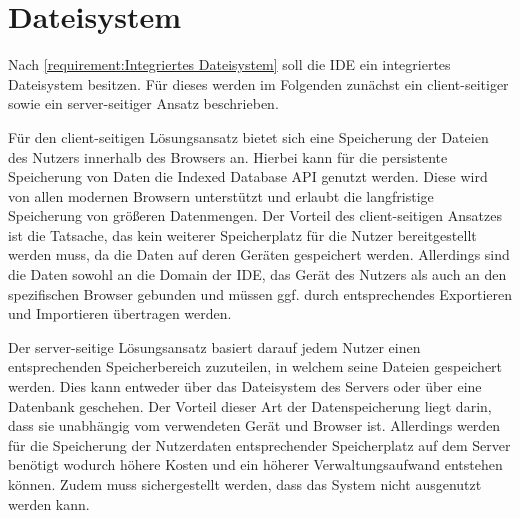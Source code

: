 \section{Dateisystem}\label{section:konzeption:dateisystem}


Nach \autoref{requirement:Integriertes Dateisystem} soll die IDE ein integriertes Dateisystem besitzen. Für dieses werden im Folgenden zunächst ein client-seitiger sowie ein server-seitiger Ansatz beschrieben.

Für den client-seitigen Lösungsansatz bietet sich eine Speicherung der Dateien des Nutzers innerhalb des Browsers an. Hierbei kann für die persistente Speicherung von Daten die Indexed Database API \cite{noauthor_indexed-database-api_nodate} genutzt werden. Diese wird von allen modernen Browsern unterstützt und erlaubt die langfristige Speicherung von größeren Datenmengen. Der Vorteil des client-seitigen Ansatzes ist die Tatsache, das kein weiterer Speicherplatz für die Nutzer bereitgestellt werden muss, da die Daten auf deren Geräten gespeichert werden. Allerdings sind die Daten sowohl an die Domain der IDE, das Gerät des Nutzers als auch an den spezifischen Browser gebunden und müssen ggf. durch entsprechendes Exportieren und Importieren übertragen werden.

Der server-seitige Lösungsansatz basiert darauf jedem Nutzer einen entsprechenden Speicherbereich zuzuteilen, in welchem seine Dateien gespeichert werden. Dies kann entweder über das Dateisystem des Servers oder über eine Datenbank geschehen. Der Vorteil dieser Art der Datenspeicherung liegt darin, dass sie unabhängig vom verwendeten Gerät und Browser ist. Allerdings werden für die Speicherung der Nutzerdaten entsprechender Speicherplatz auf dem Server benötigt wodurch höhere Kosten und ein höherer Verwaltungsaufwand entstehen können. Zudem muss sichergestellt werden, dass das System nicht ausgenutzt werden kann.


